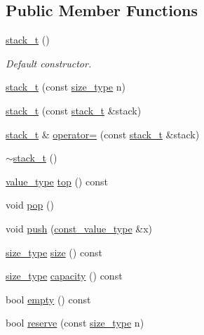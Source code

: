 \subsection*{Public Member Functions}
\begin{DoxyCompactItemize}
\item 
\mbox{\label{classstk_1_1stack__t_ad8f2c6c72f3cc6d0b55c37c18ba77935}} 
\hyperlink{classstk_1_1stack__t_ad8f2c6c72f3cc6d0b55c37c18ba77935}{stack\+\_\+t} ()
\begin{DoxyCompactList}\small\item\em Default constructor. \end{DoxyCompactList}\item 
\hyperlink{classstk_1_1stack__t_acf68532e10f96d64c7745372dd1afba2}{stack\+\_\+t} (const \hyperlink{classstk_1_1stack__t_a591d5ffc540c9f27e5618f9aa4d67cad}{size\+\_\+type} n)
\item 
\hyperlink{classstk_1_1stack__t_ac5b1b45543c317bead3fe05ba64618ae}{stack\+\_\+t} (const \hyperlink{classstk_1_1stack__t}{stack\+\_\+t} \&stack)
\item 
\hyperlink{classstk_1_1stack__t}{stack\+\_\+t} \& \hyperlink{classstk_1_1stack__t_ae89dec429ddba4dda06f6c57fc688cc9}{operator=} (const \hyperlink{classstk_1_1stack__t}{stack\+\_\+t} \&stack)
\item 
\hyperlink{classstk_1_1stack__t_a45e9376d38de6b4c43c0edd54138edaa}{$\sim$stack\+\_\+t} ()
\item 
\hyperlink{classstk_1_1stack__t_a2e10db77beb285902df2b32f30209067}{value\+\_\+type} \hyperlink{classstk_1_1stack__t_a8850aa2ebf5ab0be43549a49b4d24339}{top} () const
\item 
void \hyperlink{classstk_1_1stack__t_a498151ba872e2b9ae2f9326b80efbbd3}{pop} ()
\item 
void \hyperlink{classstk_1_1stack__t_a17e043f3eb3b4ae3b0494a4e0ff1a1b5}{push} (\hyperlink{classstk_1_1stack__t_a0beb74f603c2354cb9af98ee65801ce7}{const\+\_\+value\+\_\+type} \&x)
\item 
\hyperlink{classstk_1_1stack__t_a591d5ffc540c9f27e5618f9aa4d67cad}{size\+\_\+type} \hyperlink{classstk_1_1stack__t_a3770048637478cc005d11a47ee4df148}{size} () const
\item 
\hyperlink{classstk_1_1stack__t_a591d5ffc540c9f27e5618f9aa4d67cad}{size\+\_\+type} \hyperlink{classstk_1_1stack__t_a04b3af82e2cf60df75bf3b8507c5de9a}{capacity} () const
\item 
bool \hyperlink{classstk_1_1stack__t_ab4878c2c4a3b11d35b67323a0f473813}{empty} () const
\item 
bool \hyperlink{classstk_1_1stack__t_a4bbfc186d4b0eab296b620b72d8f872d}{reserve} (const \hyperlink{classstk_1_1stack__t_a591d5ffc540c9f27e5618f9aa4d67cad}{size\+\_\+type} n)
\end{DoxyCompactItemize}
